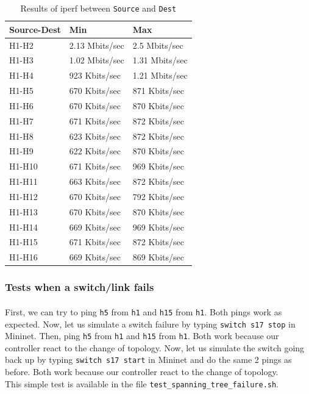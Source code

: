 \documentclass[a4paper, 11pt, oneside]{article}
\begin{document}
\begin{table}[H]
    \centering
    \begin{tabular}{|l|l|l|}
    \hline
    \textbf{Source-Dest} & \textbf{Min}   & \textbf{Max}   \\ \hline
    H1-H2                & 2.13 Mbits/sec & 2.5 Mbits/sec  \\ \hline
    H1-H3                & 1.02 Mbits/sec & 1.31 Mbits/sec \\ \hline
    H1-H4                & 923 Kbits/sec  & 1.21 Mbits/sec \\ \hline
    H1-H5                & 670 Kbits/sec  & 871 Kbits/sec  \\ \hline
    H1-H6                & 670 Kbits/sec  & 870 Kbits/sec  \\ \hline
    H1-H7                & 671 Kbits/sec  & 872 Kbits/sec  \\ \hline
    H1-H8                & 623 Kbits/sec  & 872 Kbits/sec  \\ \hline
    H1-H9                & 622 Kbits/sec  & 870 Kbits/sec  \\ \hline
    H1-H10               & 671 Kbits/sec  & 969 Kbits/sec  \\ \hline
    H1-H11               & 663 Kbits/sec  & 872 Kbits/sec  \\ \hline
    H1-H12               & 670 Kbits/sec  & 792 Kbits/sec  \\ \hline
    H1-H13               & 670 Kbits/sec  & 870 Kbits/sec  \\ \hline
    H1-H14               & 669 Kbits/sec  & 969 Kbits/sec  \\ \hline
    H1-H15               & 671 Kbits/sec  & 872 Kbits/sec  \\ \hline
    H1-H16               & 669 Kbits/sec  & 869 Kbits/sec  \\ \hline
    \end{tabular}
    \caption{Results of iperf between \texttt{Source} and \texttt{Dest}}
    \label{table:ST_bw}
    \end{table}


\subsubsection{Tests when a switch/link fails}
\paragraph{}First, we can try to ping \texttt{h5} from \texttt{h1} and \texttt{h15} from \texttt{h1}. Both pings work as expected. Now, let us simulate a switch failure by typing \texttt{switch s17 stop} in Mininet. Then, ping \texttt{h5} from \texttt{h1} and \texttt{h15} from \texttt{h1}. Both work because our controller react to the change of topology. Now, let us simulate the switch going back up by typing \texttt{switch s17 start} in Mininet and do the same 2 pings as before. Both work because our controller react to the change of topology.\\
This simple test is available in the file \texttt{test\_spanning\_tree\_failure.sh}.
\end{document}
